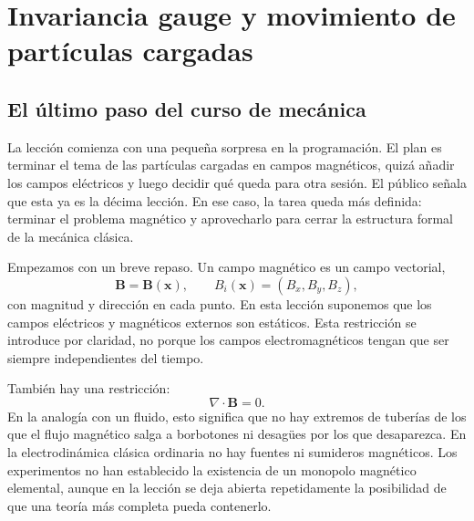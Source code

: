 \chapter{Invariancia gauge y movimiento de partículas cargadas}


\section{El último paso del curso de mecánica}

La lección comienza con una pequeña sorpresa en la programación. El plan es terminar el tema de las partículas cargadas en campos magnéticos, quizá añadir los campos eléctricos y luego decidir qué queda para otra sesión. El público señala que esta ya es la décima lección. En ese caso, la tarea queda más definida: terminar el problema magnético y aprovecharlo para cerrar la estructura formal de la mecánica clásica.

Empezamos con un breve repaso. Un campo magnético es un campo vectorial,
\begin{equation}
  \mathbf B=\mathbf B(\mathbf x),
  \qquad
  B_i(\mathbf x)=(B_x,B_y,B_z),
\end{equation}
con magnitud y dirección en cada punto. En esta lección suponemos que los campos eléctricos y magnéticos externos son estáticos. Esta restricción se introduce por claridad, no porque los campos electromagnéticos tengan que ser siempre independientes del tiempo.

También hay una restricción:
\begin{equation}
  \nabla\cdot\mathbf B=0.
\end{equation}
En la analogía con un fluido, esto significa que no hay extremos de tuberías de los que el flujo magnético salga a borbotones ni desagües por los que desaparezca. En la electrodinámica clásica ordinaria no hay fuentes ni sumideros magnéticos. Los experimentos no han establecido la existencia de un monopolo magnético elemental, aunque en la lección se deja abierta repetidamente la posibilidad de que una teoría más completa pueda contenerlo.

